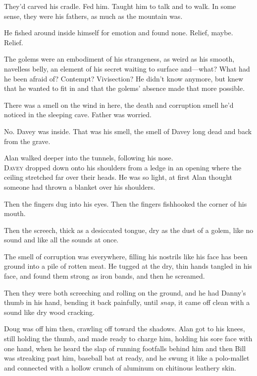 \documentclass{article}
\begin{document}
They'd carved his cradle.  Fed him.  Taught him to talk and to walk. 
In some sense, they were his fathers, as much as the mountain was.

He fished around inside himself for emotion and found none.  Relief,
maybe.  Relief.

The golems were an embodiment of his strangeness, as weird as his
smooth, navelless belly, an element of his secret waiting to surface
and---what?  What had he been afraid of?  Contempt?  Vivisection?  He
didn't know anymore, but knew that he wanted to fit in and that the
golems' absence made that more possible.

There was a smell on the wind in here, the death and corruption smell
he'd noticed in the sleeping cave.  Father was worried.

No.  Davey was inside.  That was his smell, the smell of Davey long
dead and back from the grave.

Alan walked deeper into the tunnels, following his nose.
\\
\lettrine[lines=3, lhang=.5, nindent=0pt, findent=2pt]{D}{avey} dropped down onto his shoulders from a ledge in an opening where
the ceiling stretched far over their heads.  He was so light, at first
Alan thought someone had thrown a blanket over his shoulders.

Then the fingers dug into his eyes.  Then the fingers fishhooked the
corner of his mouth.

Then the screech, thick as a desiccated tongue, dry as the dust of a
golem, like no sound and like all the sounds at once.

The smell of corruption was everywhere, filling his nostrils like his
face has been ground into a pile of rotten meat.  He tugged at the
dry, thin hands tangled in his face, and found them strong as iron
bands, and then he screamed.

Then they were both screeching and rolling on the ground, and he had
Danny's thumb in his hand, bending it back painfully, until
\textit{snap}, it came off clean with a sound like dry wood cracking.

Doug was off him then, crawling off toward the shadows.  Alan got to
his knees, still holding the thumb, and made ready to charge him,
holding his sore face with one hand, when he heard the slap of running
footfalls behind him and then Bill was streaking past him, baseball
bat at ready, and he swung it like a polo-mallet and connected with a
hollow crunch of aluminum on chitinous leathery skin.
\end{document}
